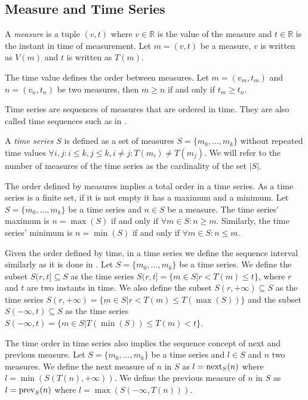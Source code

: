\subsection{Measure and Time Series}

A \emph{measure} is a tuple $(v,t)$ where $v\in{\mathbb{R}}$ is the
value of the measure and $t \in \mathbb{R}$ is the instant in time of
measurement. Let $m = (v,t)$ be a measure, $v$ is written as $V(m)$ and $t$
is written as $T(m)$.

The time value defines the order between measures.  Let $m = (v_m, t_m)$
and $n = (v_n, t_n)$ be two measures, then $m\geq n$ if and only if
$t_m\geq t_n$.


Time series are sequences of measures that are ordered in time. They
are also called time sequences such as in \cite{last:hetland}.
\begin{definition}
  A \emph{time series} $S$ is defined as a set of measures
  $S = \{m_0, \ldots, m_k\}$ without repeated time values $\forall i,j:
  i\leq k, j\leq k, i\neq j : T(m_i)\neq T(m_j)$. We will refer to the
  number of measures of the time series as the cardinality of the set
  $|S|$.
\end{definition}

The order defined by measures implies a total order in a time
series. As a time series is a finite set, if it is not empty it has a
maximum and a minimum.  Let $S=\{m_0,\ldots,m_k\}$ be a time series
and $n\in S$ be a measure. The time series' maximum is $n=\max(S)$ if
and only if $\forall m \in S: n \geq m $.  Similarly, the time series'
minimum is $n=\min(S)$ if and only if $\forall m \in S: n \leq m$.

Given the order defined by time, in a time series we define the
sequence interval similarly as it is done in
\cite{last:keogh,last:hetland}.
  Let $S=\{m_0, \ldots, m_k\}$ be a time series. We define the subset
  $S(r,t] \subseteq S$ as the time series $S(r,t]=\{m\in S |
  r<T(m)\leq t\}$, where $r$ and $t$ are two instants in time.
  We also define the subset $S(r,+\infty)\subseteq S$ as the time
  series $S(r,+\infty) = \{m\in S | r< T(m) \leq T(\max(S))\}$ and the
  subset $S(-\infty,t)\subseteq S$ as the time series $S(-\infty,t) =
  \{m\in S | T(\min(S))\leq T(m) < t\}$.


The time order in time series also implies the sequence concept of
next and previous measure.
  Let $S=\{m_0, \ldots, m_k\}$ be a time series and $l\in S$ and $n$
  two measures. We define the next measure of $n$ in $S$ as
  $l=\operatorname*{next}_S(n)$ where $l = \min(S(T(n),+\infty))$. We define
  the previous measure of $n$ in $S$ as $l=\operatorname*{prev}_S(n)$ where $l =
  \max(S(-\infty,T(n)))$.



